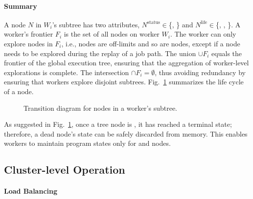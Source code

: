 \paragraph{Summary}

\newcommand{\status}{\ensuremath{\mathrm{status}}\xspace}
\newcommand{\alive}{\ensuremath{\mathrm{life}}\xspace}

A node $N$ in $W_i$'s subtree has two attributes, $N^{\status} \in$\{\materialized, \virtual\!\} and $N^{\alive} \in$\{\candidate, \fence, \dead\!\}.  A worker's frontier $F_i$ is the set of all \candidate nodes on worker $W_i$.  The worker can only explore nodes in $F_i$, i.e., \dead nodes are off-limits and so are \fence nodes, except if a \fence node needs to be explored during the replay of a job path.  The union $\cup F_i$ equals the frontier of the global execution tree, ensuring that the aggregation of worker-level explorations is complete.  The intersection $\cap F_i = \emptyset$, thus avoiding redundancy by ensuring that workers explore disjoint subtrees.  Fig.~\ref{fig:transitions} summarizes the life cycle of a node.

\begin{figure}[h!]
  \centering
  \hspace{-4mm}
  \caption{Transition diagram for nodes in a worker's subtree.}
 \label{fig:transitions}
\end{figure}

As suggested in Fig.~\ref{fig:transitions}, once a tree node is \dead, it has reached a terminal state; therefore, a dead node's state can be safely discarded from memory.  This enables workers to maintain program states only for \candidate and \fence nodes.


\subsection{Cluster-level Operation}
\label{sec:loadBalancing}

\paragraph{Load Balancing}

